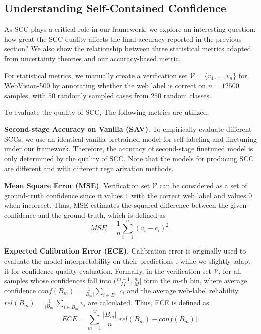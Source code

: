 \documentclass[runningheads]{llncs}
\begin{document}
\subsection{Understanding Self-Contained Confidence}
\label{S:exp-conf}
As SCC plays a critical role in our framework, we explore an interesting question: 
how great the SCC quality affects the final accuracy reported in the previous section? We also show the relationship between three statistical metrics adapted from uncertainty theories and our accuracy-based metric. 

For statistical metrics, we manually create a verification set $\mathcal{V}=\{v_1, \dots, v_n\}$ for WebVision-500 by annotating whether the web label is correct on $n=12500$ samples, with $50$ randomly sampled cases from $250$ random classes. 

To evaluate the quality of SCC, The following metrics are utilized.

\textbf{Second-stage Accuracy on Vanilla (SAV)}. 
To empirically evaluate different SCCs, we use an identical vanilla pretrained model for self-labeling and finetuning under our framework. Therefore, the accuracy of second-stage finetuned model is only determined by the quality of SCC. Note that the models for producing SCC are different and with different regularization methods.
	
\textbf{Mean Square Error (MSE)}. Verification set $\mathcal{V}$ can be considered as a set of ground-truth confidence since it values $1$ with the correct web label and values $0$ when incorrect. Thus, MSE estimates the squared difference between the given confidence and the ground-truth, which is defined as 
\begin{equation}
\label{E:mse}
\textit{MSE} = \frac{1}{n}\sum_{i=1}^{n}(v_i - c_i)^2.
\end{equation}

\textbf{Expected Calibration Error (ECE)}. Calibration error is originally used to evaluate the model interpretability on their predictions \cite{guo2017calibration}, while we slightly adapt it for confidence quality evaluation. 
Formally, in the verification set $\mathcal{V}$, for all samples whose confidences fall into $(\frac{m-1}{M},\frac{m}{M}]$ form the $m$-th bin, where average confidence $\textit{conf}(B_m)=\frac{1}{|B_m|}\sum_{i\in B_m}c_i$ and the average web-label reliability $\textit{rel}(B_m)=\frac{1}{|B_m|}\sum_{i\in B_m}v_i$ are calculated. Thus, ECE is defined as
\begin{equation}
\label{E:ece}
\textit{ECE} = \sum_{m=1}^{M}\frac{|B_m|}{n}\biggl|\textit{rel}(B_m) - \textit{conf}(B_m)\biggr|.
\end{equation}
\end{document}
